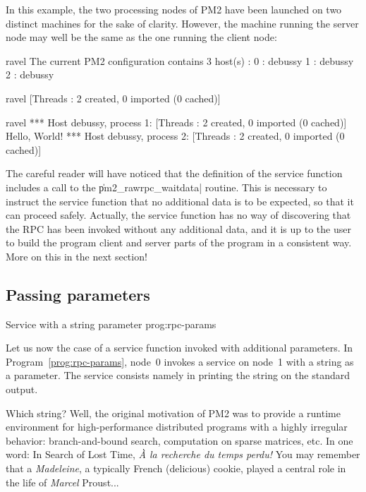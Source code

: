 In this example, the two processing nodes of PM2 have been launched on
two distinct machines for the sake of clarity.  However, the machine
running the server node may well be the same as the one running the
client node:
\begin{shell}
ravel%
The current PM2 configuration contains 3 host(s) :
0 : debussy
1 : debussy
2 : debussy

ravel%
[Threads : 2 created, 0 imported (0 cached)]

ravel%
*** Host debussy, process 1:
[Threads : 2 created, 0 imported (0 cached)]
Hello, World!
*** Host debussy, process 2:
[Threads : 2 created, 0 imported (0 cached)]
\end{shell}

The careful reader will have noticed that the definition of the
service function includes a call to the \|pm2_rawrpc_waitdata|
routine. This is necessary to instruct the service function that no
additional data is to be expected, so that it can proceed safely.
Actually, the service function has no way of discovering that the RPC
has been invoked without any additional data, and it is up to the user
to build the program client and server parts of the program in a
consistent way. More on this in the next section!

\subsection{Passing parameters}

 {Service with a string
  parameter} {prog:rpc-params}

Let us now the case of a service function invoked with additional
parameters. In Program~\ref{prog:rpc-params}, node~0 invokes a service
on node~1 with a string as a parameter. The service consists namely in
printing the string on the standard output.
  
Which string? Well, the original motivation of PM2 was to provide a
runtime environment for high-performance distributed programs with a
highly irregular behavior: branch-and-bound search, computation on
sparse matrices, etc. In one word: In Search of Lost Time, \emph{\`A
  la recherche du temps perdu!} You may remember that a
\emph{Madeleine}, a typically French (delicious) cookie, played a
central role in the life of \emph{Marcel} Proust...
  
